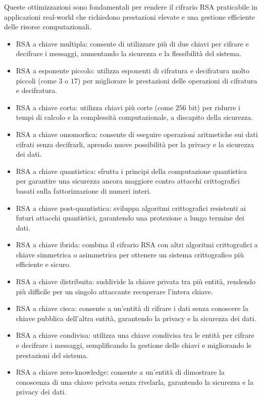 \documentclass[a4paper,12pt]{report}
\begin{document}
Queste ottimizzazioni sono fondamentali per rendere il cifrario RSA praticabile in applicazioni real-world che richiedono prestazioni elevate e una gestione efficiente delle risorse computazionali.

\begin{itemize}
    \item RSA a chiave multipla: consente di utilizzare più di due chiavi per cifrare e decifrare i messaggi, aumentando la sicurezza e la flessibilità del sistema.
    \item RSA a esponente piccolo: utilizza esponenti di cifratura e decifratura molto piccoli (come $3$ o $17$) per migliorare le prestazioni delle operazioni di cifratura e decifratura.
    \item RSA a chiave corta: utilizza chiavi più corte (come $256$ bit) per ridurre i tempi di calcolo e la complessità computazionale, a discapito della sicurezza.
    \item RSA a chiave omomorfica: consente di eseguire operazioni aritmetiche sui dati cifrati senza decifrarli, aprendo nuove possibilità per la privacy e la sicurezza dei dati.
    \item RSA a chiave quantistica: sfrutta i principi della computazione quantistica per garantire una sicurezza ancora maggiore contro attacchi crittografici basati sulla fattorizzazione di numeri interi.
    \item RSA a chiave post-quantistica: sviluppa algoritmi crittografici resistenti ai futuri attacchi quantistici, garantendo una protezione a lungo termine dei dati.
    \item RSA a chiave ibrida: combina il cifrario RSA con altri algoritmi crittografici a chiave simmetrica o asimmetrica per ottenere un sistema crittografico più efficiente e sicuro.
    \item RSA a chiave distribuita: suddivide la chiave privata tra più entità, rendendo più difficile per un singolo attaccante recuperare l'intera chiave.
    \item RSA a chiave cieca: consente a un'entità di cifrare i dati senza conoscere la chiave pubblica dell'altra entità, garantendo la privacy e la sicurezza dei dati.
    \item RSA a chiave condivisa: utilizza una chiave condivisa tra le entità per cifrare e decifrare i messaggi, semplificando la gestione delle chiavi e migliorando le prestazioni del sistema.
    \item RSA a chiave zero-knowledge: consente a un'entità di dimostrare la conoscenza di una chiave privata senza rivelarla, garantendo la sicurezza e la privacy dei dati.

\end{itemize}
\end{document}
